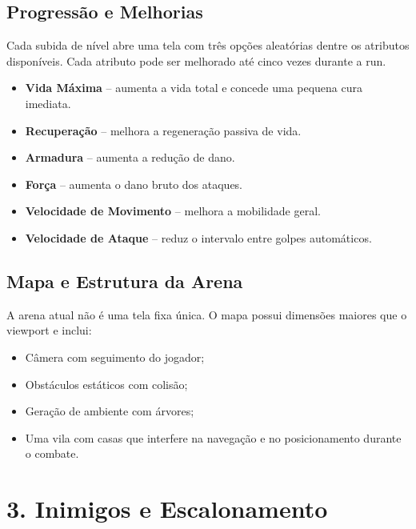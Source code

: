 \documentclass[a4paper,12pt]{article}
\begin{document}
\pagebreak

\subsection*{Progressão e Melhorias}

Cada subida de nível abre uma tela com três opções aleatórias dentre os atributos disponíveis. Cada atributo pode ser melhorado até cinco vezes durante a run.

\begin{itemize}
    \item \textbf{Vida Máxima} -- aumenta a vida total e concede uma pequena cura imediata.
    \item \textbf{Recuperação} -- melhora a regeneração passiva de vida.
    \item \textbf{Armadura} -- aumenta a redução de dano.
    \item \textbf{Força} -- aumenta o dano bruto dos ataques.
    \item \textbf{Velocidade de Movimento} -- melhora a mobilidade geral.
    \item \textbf{Velocidade de Ataque} -- reduz o intervalo entre golpes automáticos.
\end{itemize}

\subsection*{Mapa e Estrutura da Arena}

A arena atual não é uma tela fixa única. O mapa possui dimensões maiores que o viewport e inclui:

\begin{itemize}
    \item Câmera com seguimento do jogador;
    \item Obstáculos estáticos com colisão;
    \item Geração de ambiente com árvores;
    \item Uma vila com casas que interfere na navegação e no posicionamento durante o combate.
\end{itemize}

\pagebreak


\section*{3. Inimigos e Escalonamento}
\end{document}
